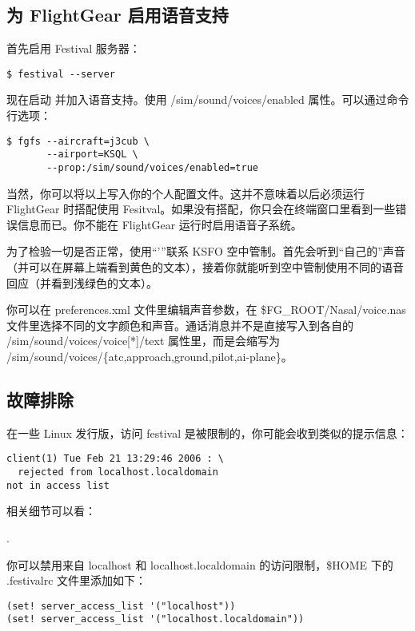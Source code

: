 \subsection{为 FlightGear 启用语音支持}

首先启用 Festival 服务器：

\begin{verbatim}
$ festival --server
\end{verbatim}

现在启动 \FlightGear{} 并加入语音支持。使用 /sim/sound/voices/enabled 属性。可以通过命令行选项：

\begin{verbatim}
$ fgfs --aircraft=j3cub \
       --airport=KSQL \
       --prop:/sim/sound/voices/enabled=true
\end{verbatim}

当然，你可以将以上写入你的个人配置文件。这并不意味着以后必须运行 FlightGear 时搭配使用 Fesitval。如果没有搭配，你只会在终端窗口里看到一些错误信息而已。你不能在 FlightGear 运行时启用语音子系统。

为了检验一切是否正常，使用“'”联系 KSFO 空中管制。首先会听到“自己的”声音（并可以在屏幕上端看到黄色的文本），接着你就能听到空中管制使用不同的语音回应（并看到浅绿色的文本）。

你可以在 preferences.xml 文件里编辑声音参数，在 \$FG\_ROOT/Nasal/voice.nas 文件里选择不同的文字颜色和声音。通话消息并不是直接写入到各自的 /sim/sound/voices/voice[*]/text 属性里，而是会缩写为\\ /sim/sound/voices/\{atc,approach,ground,pilot,ai-plane\}。

\subsection{故障排除}

在一些 Linux 发行版，访问 festival 是被限制的，你可能会收到类似的提示信息：

\begin{verbatim}
client(1) Tue Feb 21 13:29:46 2006 : \
  rejected from localhost.localdomain
not in access list
\end{verbatim}

相关细节可以看：

.

你可以禁用来自 localhost 和 localhost.localdomain 的访问限制，\$HOME 下的 .festivalrc 文件里添加如下：

\begin{verbatim}
(set! server_access_list '("localhost"))
(set! server_access_list '("localhost.localdomain"))
\end{verbatim}


